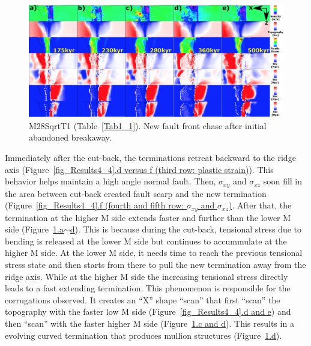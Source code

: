 \begin{figure}[h]
  \centering
    \includegraphics[width=1.0\textwidth]{./Figures/fig_Results4_9_sqrt_cut_back_new_fault_chase.eps}
  \caption{M28SqrtT1 (Table~\hyperref[Tab1_1]{\ref{Tab1_1}}). New fault front chase after initial abandoned breakaway.}
 \label{fig_Results4_9}
\end{figure}

Immediately after the cut-back, the terminations retreat backward to the ridge axis (Figure~\hyperref[fig_Results4_4]{\ref{fig_Results4_4}.d versus f (third row: plastic strain)}). This behavior helps maintain a high angle normal fault. Then, $\sigma_{xy}$ and $\sigma_{xz}$ soon fill in the area between cut-back created fault scarp and the new termination (Figure~\hyperref[fig_Results4_4]{\ref{fig_Results4_4}.f (fourth and fifth row: $\sigma_{xy}$ and $\sigma_{xz}$)}. After that, the termination at the higher M side extends faster and further than the lower M side (Figure~\hyperref[fig_Results4_9]{\ref{fig_Results4_9}.a$\sim$d}). This is because during the cut-back, tensional stress due to bending is released at the lower M side but continues to accummulate at the higher M side. At the lower M side, it needs time to reach the previous tensional stress state and then starts from there to pull the new termination away from the ridge axis. While at the higher M side the increasing tensional stress directly leads to a fast extending termination.
This phenomenon is responsible for the corrugations observed. It creates an ``X'' shape ``scan'' that first ``scan'' the topography with the faster low M side (Figure~\hyperref[fig_Results4_4]{\ref{fig_Results4_4}.d and e}) and then ``scan'' with the faster higher M side (Figure~\hyperref[fig_Results4_9]{\ref{fig_Results4_9}.c and d}). This results in a evolving curved termination that produces mullion structures (Figure~\hyperref[fig_Results4_9]{\ref{fig_Results4_9}.d}).    

